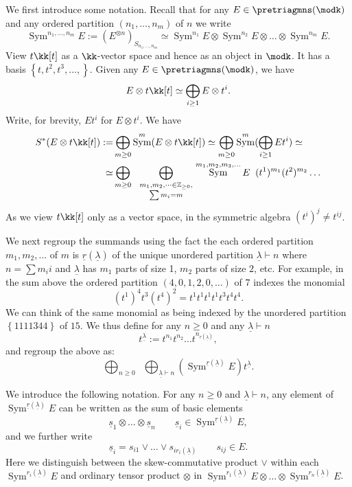\documentclass[12pt,a4paper,reqno]{amsart}
\DeclareMathOperator\Sym{Sym}
\begin{document}
We first introduce some notation. Recall that for any $E \in
\pretriagmns(\modk)$ and any ordered partition $(n_1, \dots, n_m)$
of $n$ we write 
$$\Sym^{n_1, \dots, n_m} E := (E^{\otimes n})_{S_{n_1, \dots, n_m}} \simeq 
\Sym^{n_1} E \otimes \Sym^{n_2} E \otimes \dots \otimes \Sym^{n_m} E.$$
View $t \kk[t]$ as a $\kk$-vector space and hence as an object in $\modk$. 
It has a basis $\left\{ t, t^2, t^3, \dots, \right\}$. 
Given any $E \in \pretriagmns(\modk)$, we have 
$$ E \otimes t\kk[t] \simeq \bigoplus_{i \geq 1} E \otimes t^i. $$
Write, for brevity, $E t^i$ for $E \otimes t^i$. We have
\begin{align}
S^*(E \otimes t \kk[t]) := 
& \bigoplus_{m \geq 0} \Sym^{m}(E \otimes t \kk[t])
\simeq \bigoplus_{m \geq 0} \Sym^{m}(\bigoplus_{i \geq 1} E t^i) \simeq 
\\
\nonumber
\simeq 
& 
\bigoplus_{m \geq 0} \;\;
\bigoplus_{
\begin{smallmatrix}
m_1, m_2, \dots \in \mathbb{Z}_{\geq 0}, \\
\sum m_i = m
\end{smallmatrix}
}
\Sym^{m_1,m_2,m_3,\dots} E\;\; (t^1)^{m_1}(t^2)^{m_2}\dots 
\end{align}
As we view $t \kk[t]$ only as a vector space, in 
the symmetric algebra $(t^i)^j \neq t^{ij}$. 

We next regroup the summands using the fact the each 
ordered partition $m_1, m_2, \dots$ of $m$ is
$\underline{r}(\underline{\lambda})$ of the unique unordered partition 
$\underline{\lambda} \vdash n$ where $n = \sum  m_i i$ and 
$\underline{\lambda}$ has $m_1$ parts of size 1, $m_2$ parts of size $2$, etc. 
For example, in the sum above the ordered partition $(4,0,1,2,0,\dots)$ 
of $7$ indexes the monomial 
$$ (t^1)^4 t^3 (t^4)^2 = t^1 t^1 t^1 t^1 t^3 t^4 t^4. $$
We can think of the same monomial as being indexed by the
unordered partition $\left\{1111344\right\}$ of $15$. 
We thus define for any $n \geq 0$ and any $\underline{\lambda} \vdash n$
$$ t^{\underline{\lambda}} := t^{n_1}t^{n_2} \dots t^{n_{r(\underline{\lambda})}}, $$
and regroup the above as:
\begin{equation}
\bigoplus_{n \geq 0} \;\;
\bigoplus_{
\underline{\lambda}\vdash n 
}
\left(\Sym^{\underline{r}(\underline{\lambda})} E \right)t^{\underline{\lambda}}. 
\end{equation}

We introduce the following notation. For any $n \geq 0$ and
$\underline{\lambda} \vdash n$, any element of 
$\Sym^{\underline{r}(\underline{\lambda})} E$ can be written as 
the sum of basic elements 
$$ \underline{s}_1 \otimes \dots \otimes \underline{s}_n
\quad \quad \underline{s}_i \in \Sym^{\underline{r}(\underline{\lambda})} E,
$$
and we further write
$$ \underline{s}_i = s_{i1} \vee \dots \vee s_{ir_i(\underline{\lambda})} \quad \quad s_{ij} \in E. $$
Here we distinguish between the skew-commutative product $\vee$ within
each $\Sym^{r_i(\underline{\lambda})} E$ and ordinary tensor product $\otimes$ in 
$\Sym^{r_1(\underline{\lambda})} E \otimes \dots \otimes 
\Sym^{r_n(\underline{\lambda})} E$. 
\end{document}
